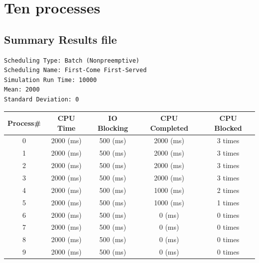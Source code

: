 \documentclass{article}
\begin{document}
\section{Ten processes}
\subsection{Summary Results file}                                              
\begin{lstlisting}
Scheduling Type: Batch (Nonpreemptive)
Scheduling Name: First-Come First-Served
Simulation Run Time: 10000
Mean: 2000
Standard Deviation: 0
\end{lstlisting}
\begin{center}                                                                 
\begin{tabular}{| c | c | c | c | c |}                                         
\hline                                                                         
Process\# &     CPU Time &      IO Blocking & CPU Completed & CPU Blocked \\
\hline
0		&2000 (ms)	&500 (ms)&	2000 (ms)&	3 times \\
\hline
1		&2000 (ms)	&500 (ms)&	2000 (ms)&	3 times \\
\hline
2		&2000 (ms)	&500 (ms)&	2000 (ms)&	3 times \\
\hline
3		&2000 (ms)	&500 (ms)&	2000 (ms)&	3 times \\
\hline
4		&2000 (ms)	&500 (ms)&	1000 (ms)&	2 times \\ 
\hline
5		&2000 (ms)	&500 (ms)&	1000 (ms)&	1 times \\
\hline
6		&2000 (ms)	&500 (ms)&	0 (ms)&		0 times \\
\hline
7		&2000 (ms)	&500 (ms)&	0 (ms)&		0 times \\
\hline
8		&2000 (ms)	&500 (ms)&	0 (ms)&		0 times \\
\hline
9		&2000 (ms)	&500 (ms)&	0 (ms)&		0 times \\
\hline
\end{tabular}
\end{center}
\end{document}
